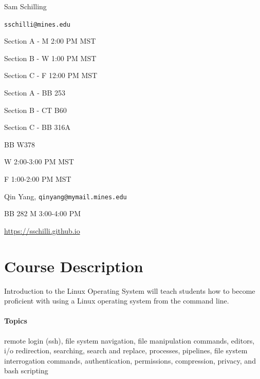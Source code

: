 \documentclass[12pt]{article}
\begin{document}
  \maketitle
\begin{description}
  \item[Instructor] Sam Schilling
  \item[Email] \texttt{sschilli@mines.edu}
  \item[Lecture Times]
  
  \item Section A - M 2:00  PM MST
  \item Section B - W 1:00  PM MST
  \item Section C - F 12:00 PM MST
  
  \item[Classrooms]
  
  \item Section A - BB 253
  \item Section B - CT B60
  \item Section C - BB 316A
  
  \item[Office Hours] BB W378 
  
  \item W 2:00-3:00 PM MST
  \item F 1:00-2:00 PM MST
  \item[TA] Qin Yang, \texttt{qinyang@mymail.mines.edu}
  \item[TA Office Hours] BB 282 M 3:00-4:00 PM
  \item[Course Webpage] \href{https://sschilli.github.io}{https://sschilli.github.io}
\end{description}
\section{Course Description}
Introduction to the Linux Operating System will teach students how to become proficient with using a Linux operating system from the command
line.

\paragraph{Topics} remote login (ssh), file system navigation, file manipulation commands, editors, i/o redirection, searching, search and replace,
processes, pipelines, file system interrogation commands, authentication, permissions, compression, privacy, and bash scripting
\end{document}
